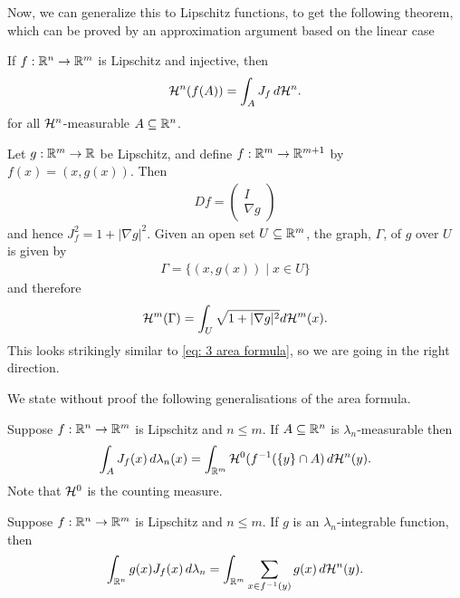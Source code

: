 Now, we can generalize this to Lipschitz functions, to get the following theorem, which can be proved by an approximation argument based on the linear case
\begin{theorem}\label{thm: area formula}
If $f:\mathbb{R}^n \to \mathbb{R}^m$ is Lipschitz and injective, then
\begin{align*}
    \mathcal{H}^n(f(A)) = \int_A J_f \, d\mathcal{H}^n.
\end{align*}
for all $\mathcal{H}^n$-measurable $A \subseteq \mathbb{R}^n$.
\end{theorem}

\begin{example}
Let $g: \mathbb{R}^m \to \mathbb{R}$ be Lipschitz, and define $f:\mathbb{R}^m \to \mathbb{R}^{m+1}$ by $f(x)=(x,g(x))$. Then
\begin{align*}
    Df=\begin{pmatrix} I \\ \nabla g \end{pmatrix}
\end{align*}
and hence $J^2_f=1+|\nabla g|^2$. Given an open set $U \subseteq \mathbb{R}^m$, the graph, $\Gamma$, of $g$ over $U$ is given by
\begin{align*}
    \Gamma = \{ (x,g(x)) \mid x \in U \}
\end{align*}
and therefore
\begin{align*}
    \mathcal{H}^m(\Gamma) = \int_U \sqrt{1 + |\nabla g|^2} d\mathcal{H}^m(x).
\end{align*}
This looks strikingly similar to \eqref{eq: 3 area formula}, so we are going in the right direction.
\end{example}

We state without proof the following generalisations of the area formula.

\begin{theorem}
Suppose $f: \mathbb{R}^n \to \mathbb{R}^m$ is Lipschitz and $n \le m$. If $A \subseteq \mathbb{R}^n$ is $\lambda_n$-measurable then
\begin{align*}
    \int_A J_f(x)\, d\lambda_n(x) = \int_{\mathbb{R}^m} \mathcal{H}^0(f^{-1}(\{y\} \cap A) \, d\mathcal{H}^n(y).
\end{align*}
Note that $\mathcal{H}^0$ is the counting measure.
\end{theorem}

\begin{theorem}
Suppose $f: \mathbb{R}^n \to \mathbb{R}^m$ is Lipschitz and $n \le m$.
If $g$ is an $\lambda_n$-integrable function, then
\begin{align*}
    \int_{\mathbb{R}^n} g(x)J_f(x) \, d\lambda_n = \int_{\mathbb{R}^m} \sum_{x \in f^{-1}(y)} g(x) \, d\mathcal{H}^n(y).
\end{align*}
\end{theorem}

